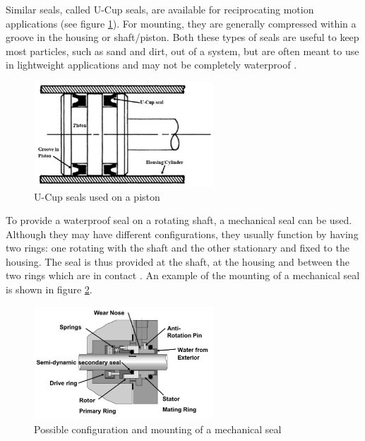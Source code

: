 Similar seals, called U-Cup seals, are available for reciprocating motion applications (see figure \ref{fig:seal_linear2}). For mounting, they are generally compressed within a groove in the housing or shaft/piston. Both these types of seals are useful to keep most particles, such as sand and dirt, out of a system, but are often meant to use in lightweight applications and may not be completely waterproof \cite{shigley_standard_2004}. 

\begin{figure}[H]
    \centering
    \includegraphics[width=0.6\textwidth]{Sections/LiteratureReview/img/seals/seal_linear2.JPG}
    \caption{U-Cup seals used on a piston \cite{shigley_standard_2004}}
    \label{fig:seal_linear2}
\end{figure}

To provide a waterproof seal on a rotating shaft, a mechanical seal can be used. Although they may have different configurations, they usually function by having two rings: one rotating with the shaft and the other stationary and fixed to the housing. The seal is thus provided at the shaft, at the housing and between the two rings which are in contact \cite{ali_m._sadegh_marks_2018} \cite{green_perrys_2019}. An example of the mounting of a mechanical seal is shown in figure \ref{fig:mechseal}. 

\begin{figure}[H]
    \centering
    \includegraphics[width=0.6\textwidth]{Sections/LiteratureReview/img/seals/mechseal.JPG}
    \caption{Possible configuration and mounting of a mechanical seal \cite{attenasio_back_2016}}
    \label{fig:mechseal}
\end{figure}

